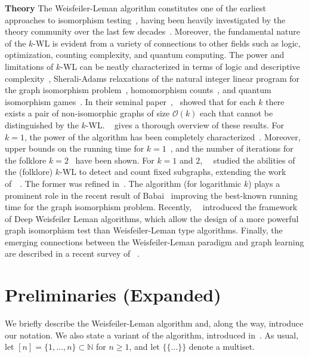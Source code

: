 \documentclass{article}
\newcommand{\xhdr}[1]{{\noindent\bfseries #1}}
\theoremstyle{definition}
\newcommand{\cO}{\ensuremath{{\mathcal O}}\xspace}
\newcommand{\NN}{\mathbb{N}}
\newcommand{\kwl}{$k$-\textsf{WL}\xspace}
\begin{document}
\xhdr{Theory}
The Weisfeiler-Leman algorithm constitutes one of the earliest approaches to isomorphism testing~\cite{Wei+1976,Wei+1968}, having been heavily investigated by the theory community over the last few decades~\cite{Gro+2014}. Moreover, the fundamental nature of the \kwl is evident from a variety of connections to other fields such as logic, optimization, counting complexity, and quantum computing. The power and limitations of $k$-WL can be neatly characterized in terms of logic and descriptive complexity~\cite{Imm+1990}, Sherali-Adams relaxations of the natural integer linear program for the graph isomorphism problem~\cite{Ast+2013,GroheO15,Mal2014}, homomorphism counts~\cite{Del+2018}, and quantum isomorphism games~\cite{Ats+2019}. In their seminal paper~\cite{Imm+1990},~\citeauthor{Cai+1992} showed that for each $k$ there exists a pair of non-isomorphic graphs of size $\cO(k)$ each that cannot be distinguished by the \kwl. \citeauthor{Gro+2014}~\cite{Gro+2014} gives a thorough overview of these results. For $k=1$, the power of the algorithm has been completely characterized~\cite{Arv+2015,Kie+2015}.  Moreover, upper bounds on the running time for $k=1$~\cite{Ber+2013,Kie+2020}, and the number of iterations for the folklore $k=2$~\cite{Kie+2016,Lic+2019} have been shown. For $k=1$ and $2$,~\citeauthor{Arv+2019}~\cite{Arv+2019} studied the abilities of the (folklore) \kwl to detect and count fixed subgraphs, extending the work of~\citeauthor{Fue+2017}~\cite{Fue+2017}. The former was refined in~\cite{Che+2020a}. The algorithm (for logarithmic $k$) plays a prominent role in the recent result of Babai~\cite{Bab+2016} improving the best-known running time for the graph isomorphism problem. Recently,~\citeauthor{Gro+2020a}~\cite{Gro+2020a} introduced the framework of Deep Weisfeiler Leman algorithms, which allow the design of a more powerful graph isomorphism test than Weisfeiler-Leman type algorithms. Finally, the emerging connections between the Weisfeiler-Leman paradigm and graph learning are described in a recent survey of \citeauthor{Gro+2020}~\cite{Gro+2020}. 


\section{Preliminaries (Expanded)}\label{prelim}

We briefly describe the Weisfeiler-Leman algorithm and, along the way, introduce our notation. We also state a variant of the algorithm, introduced in~\cite{Mal2014}. As usual, let $[n] = \{ 1, \dotsc, n \} \subset \NN$ for $n \geq 1$, and let $\{\!\!\{ \dots\}\!\!\}$ denote a multiset. 
\end{document}
